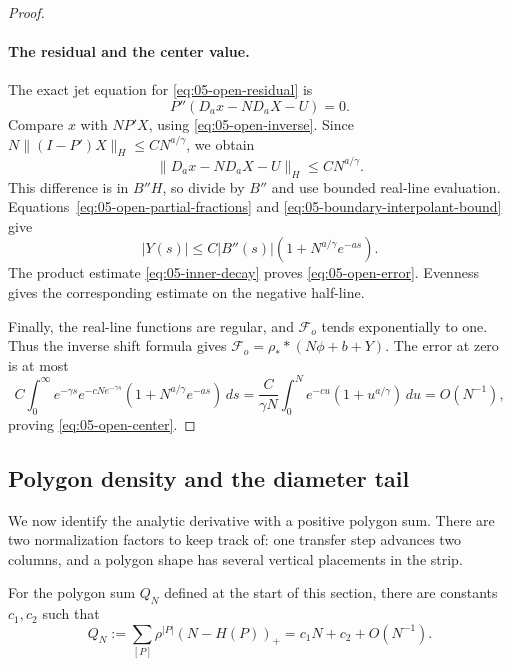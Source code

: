 \begin{proof}
\paragraph{The residual and the center value.}
The exact jet equation for \eqref{eq:05-open-residual} is
\[
 P''(D_ax-ND_aX-U)=0.
\]
Compare \(x\) with \(NP'X\), using \eqref{eq:05-open-inverse}. Since
\(N\|(I-P')X\|_H\le C N^{a/\gamma}\),
we obtain
\[
 \|D_ax-ND_aX-U\|_H\le C N^{a/\gamma}.
\]
This difference is in \(B''H\), so divide by \(B''\) and use bounded real-line evaluation. Equations~\eqref{eq:05-open-partial-fractions} and \eqref{eq:05-boundary-interpolant-bound} give
\[
 |Y(s)|\le C|B''(s)|(1+N^{a/\gamma}e^{-as}).
\]
The product estimate \eqref{eq:05-inner-decay} proves \eqref{eq:05-open-error}. Evenness gives the corresponding estimate on the negative half-line.

Finally, the real-line functions are regular, and \(\mathcal F_o\) tends exponentially to one. Thus the inverse shift formula gives
\(\mathcal F_o=\rho_* *(N\phi+b+Y)\).
The error at zero is at most
\[
 C\int_0^\infty e^{-\gamma s}e^{-cNe^{-\gamma s}}
                    (1+N^{a/\gamma}e^{-as})\,ds
 =\frac{C}{\gamma N}\int_0^N e^{-cu}(1+u^{a/\gamma})\,du
 =O(N^{-1}),
\]
proving \eqref{eq:05-open-center}.
\end{proof}

\subsection{Polygon density and the diameter tail}

We now identify the analytic derivative with a positive polygon sum.
There are two normalization factors to keep track of: one transfer step
advances two columns, and a polygon shape has several vertical placements
in the strip.

\begin{proposition}
\label{prop:05-open-pressure}
For the polygon sum \(Q_N\) defined at the start of this section, there
are constants \(c_1,c_2\) such that
\begin{equation}
 Q_N:=\sum_{[P]}\rho^{|P|}(N-H(P))_+
       =c_1N+c_2+O(N^{-1}).
 \label{eq:05-strip-polygon-pressure}
\end{equation}
\end{proposition}

